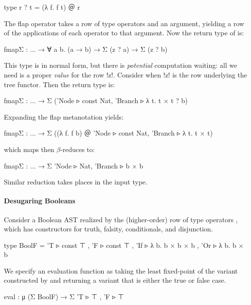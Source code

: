 \begin{rosi}
type r ? t = (λ f. f t) ＠ r
\end{rosi}

\Ni The flap operator takes a row of type operators and an argument, yielding a row of the applications of each operator to that argument. Now the return type of  is:

\begin{rosi}
fmapΣ : ... → ∀ a b. (a → b) → Σ (z ? a) → Σ (z ? b) 
\end{rosi}

This type is in normal form, but there is \emph{potential} computation waiting: all we need is a proper \emph{value} for the row !z!. Consider when !z! is the row underlying the tree functor. Then the return type is:

\begin{rosi}
fmapΣ : ... → Σ ({'Node ▹ const Nat, 
                   'Branch ▹ λ t. t × t} ? b)
\end{rosi}

\Ni Expanding the flap metanotation yields:
\begin{rosi}
fmapΣ : ... → Σ ((λ f. f b) ＠  
               {'Node ▹ const Nat, 'Branch ▹ λ t. t × t})
\end{rosi}
\Ni which maps then $\beta$-reduces to: 

\begin{rosi}
fmapΣ : ... → Σ {'Node ▹ Nat, 'Branch ▹ b × b}
\end{rosi}

\Ni Similar reduction takes places in the input type.

\paragraph{Desugaring Booleans}

Consider a Boolean AST realized by the (higher-order) row of type operators , which has constructors for truth, falsity, conditionals, and disjunction.

\begin{rosi} 
type BoolF = {'T ▹ const ⊤ , 'F ▹ const ⊤ , 
              'If ▹ λ b. b × b × b , 'Or ▹ λ b. b × b}  
\end{rosi}

We specify an evaluation function as taking the least fixed-point of the variant constructed by  and returning a variant that is either the true or false case.

\begin{rosi}
eval : μ (Σ BoolF) → Σ {'T ▹ ⊤ , 'F ▹ ⊤}
\end{rosi}

